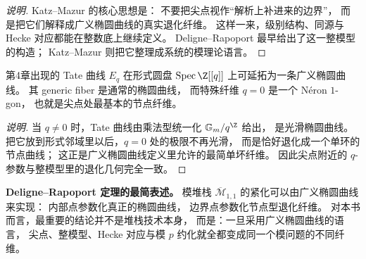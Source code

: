\begin{proof}[说明]
Katz--Mazur 的核心思想是：
不要把尖点视作“解析上补进来的边界”，
而是把它们解释成广义椭圆曲线的真实退化纤维。
这样一来，级别结构、同源与 Hecke 对应都能在整数底上继续定义。
Deligne--Rapoport 最早给出了这一整模型的构造；
Katz--Mazur 则把它整理成系统的模理论语言。
\end{proof}

\begin{proposition}
\label{prop:tate-curve-generalized-elliptic}
第4章出现的 Tate 曲线 $E_q$ 在形式圆盘 $\operatorname{Spec}\Z[[q]]$ 上可延拓为一条广义椭圆曲线。
其 generic fiber 是通常的椭圆曲线，
而特殊纤维 $q=0$ 是一个 N\'eron $1$-gon，
也就是尖点处最基本的节点纤维。
\end{proposition}

\begin{proof}[说明]
当 $q\neq 0$ 时，Tate 曲线由乘法型统一化 $\mathbb G_m/q^\Z$ 给出，
是光滑椭圆曲线。
把它放到形式邻域里以后，$q=0$ 处的极限不再光滑，
而是恰好退化成一个单环的节点曲线；
这正是广义椭圆曲线定义里允许的最简单坏纤维。
因此尖点附近的 $q$-参数与整模型里的退化几何完全一致。
\end{proof}

\textbf{Deligne--Rapoport 定理的最简表述。}
模堆栈 $\overline{\mathcal M}_{1,1}$ 的紧化可以由广义椭圆曲线来实现：
内部点参数化真正的椭圆曲线，
边界点参数化节点型退化纤维。
对本书而言，最重要的结论并不是堆栈技术本身，
而是：一旦采用广义椭圆曲线的语言，
尖点、整模型、Hecke 对应与模 $p$ 约化就全都变成同一个模问题的不同纤维。

